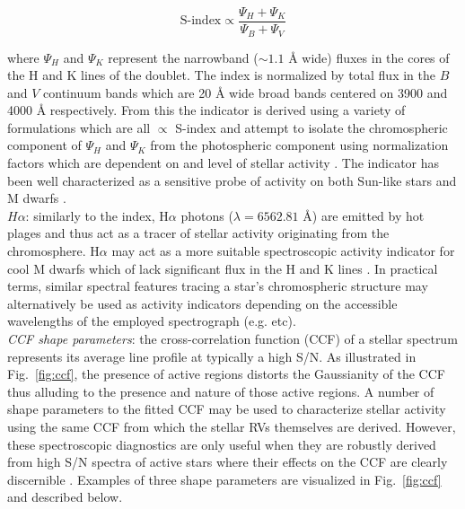 \begin{equation}
  \text{S-index} \propto \frac{\Psi_H + \Psi_K}{\Psi_B + \Psi_V}
\end{equation}

\noindent where $\Psi_H$ and $\Psi_K$ represent the narrowband
($\sim 1.1$ \AA{} wide) fluxes in the cores of the H and K lines of the \caii{}
doublet. The index is normalized by total flux in the $B$ and $V$ continuum bands
which are 20 \AA{} wide broad bands centered on 3900 and 4000 \AA{} respectively.
From this the \Rhk{} indicator is derived using a variety of formulations which are
all $\propto$ S-index and attempt to isolate the chromospheric component of
$\Psi_H$ and $\Psi_K$ from the photospheric component using normalization factors
which are dependent on \teff{} and level of stellar activity \citep{lovis11}. The
\Rhk{} indicator has been well characterized as a sensitive probe of activity on
both Sun-like stars and M dwarfs
\citep[e.g.][]{wright04,lovis11,astudillodefru17b}. \\

$H\alpha$: 
similarly to the \Rhk{} index, H$\alpha$ photons ($\lambda = 6562.81$ \AA{)} are emitted by
hot plages and thus act as a tracer of stellar activity originating from the chromosphere.
H$\alpha$ may act as a more suitable spectroscopic activity indicator for cool M dwarfs
which of lack significant flux in the \caii{} H and K lines \citep{robertson14}.
In practical terms,  
similar spectral features tracing a star's chromospheric structure may alternatively be used
as activity indicators depending on the accessible wavelengths of the employed spectrograph
(e.g. \hei{,} \nai{,} etc). \\


\emph{CCF shape parameters}:
the cross-correlation function (CCF) of a stellar spectrum represents its average line profile
at typically a high S/N.
As illustrated in Fig.~\ref{fig:ccf}, the presence of active regions distorts
the Gaussianity of the CCF thus alluding to the presence and nature of those active regions.
A number of shape parameters to the fitted CCF may be used to characterize stellar activity
using the same CCF from which the stellar RVs themselves are derived. However, these
spectroscopic diagnostics are only useful when they are robustly derived from high S/N
spectra of active stars where their effects on the CCF are clearly discernible \citep{desort07}.
Examples of three
shape parameters are visualized in Fig.~\ref{fig:ccf} and described below. \\

